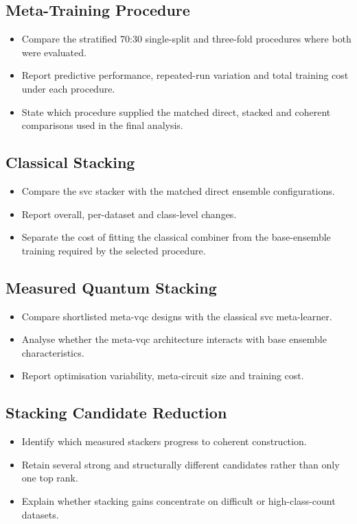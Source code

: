 \documentclass[]{UCD_CS_MSc_AAI_Report}
\begin{document}
\subsection{Meta-Training Procedure}
\begin{itemize}
    \item Compare the stratified 70:30 single-split and three-fold procedures where both were evaluated.
    \item Report predictive performance, repeated-run variation and total training cost under each procedure.
    \item State which procedure supplied the matched direct, stacked and coherent comparisons used in the final analysis.
\end{itemize}

\subsection{Classical Stacking}
\begin{itemize}
    \item Compare the \ac{svc} stacker with the matched direct ensemble configurations.
    \item Report overall, per-dataset and class-level changes.
    \item Separate the cost of fitting the classical combiner from the base-ensemble training required by the selected procedure.
\end{itemize}

\subsection{Measured Quantum Stacking}
\begin{itemize}
    \item Compare shortlisted meta-\ac{vqc} designs with the classical \ac{svc} meta-learner.
    \item Analyse whether the meta-\ac{vqc} architecture interacts with base ensemble characteristics.
    \item Report optimisation variability, meta-circuit size and training cost.
\end{itemize}

\subsection{Stacking Candidate Reduction}
\begin{itemize}
    \item Identify which measured stackers progress to coherent construction.
    \item Retain several strong and structurally different candidates rather than only one top rank.
    \item Explain whether stacking gains concentrate on difficult or high-class-count datasets.
\end{itemize}
\end{document}
